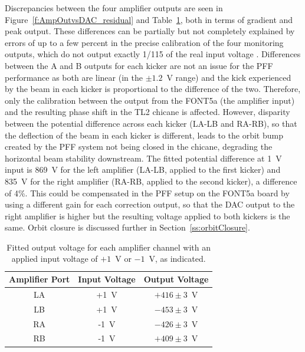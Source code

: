 Discrepancies between the four amplifier outputs are seen in Figure~\ref{f:AmpOutvsDAC_residual} and Table~\ref{t:AmpOutVsDAC}, both in terms of gradient and peak output. These differences can be partially but not completely explained by errors of up to a few percent in the precise calibration of the four monitoring outputs, which do not output exactly 1/115 of the real input voltage \cite{colinPriv}. Differences between the A and B outputs for each kicker are not an issue for the PFF performance as both are linear (in the \(\pm1.2\)~V range) and the kick experienced by the beam in each kicker is proportional to the difference of the two. Therefore, only the calibration between the output from the FONT5a (the amplifier input) and the resulting phase shift in the TL2 chicane is affected. However, disparity between the potential difference across each kicker (LA-LB and RA-RB), so that the deflection of the beam in each kicker is different, leads to the orbit bump created by the PFF system not being closed in the chicane, degrading the horizontal beam stability downstream. The fitted potential difference at 1~V input is 869~V for the left amplifier (LA-LB, applied to the first kicker) and 835~V for the right amplifier (RA-RB, applied to the second kicker), a difference of 4\%. This could be compensated in the PFF setup on the FONT5a board by using a different gain for each correction output, so that the DAC output to the right amplifier is higher but the resulting voltage applied to both kickers is the same. Orbit closure is discussed further in Section~\ref{ss:orbitClosure}.

\begin{table}
  \begin{center}
    \begin{tabular}{| c c c |}
	   \hline
       Amplifier Port & Input Voltage & Output Voltage \\ \hline
       LA & +1~V & \(+416\pm3\)~V \\
	   LB & +1~V & \(-453\pm3\)~V \\
	   RA & -1~V & \(-426\pm3\)~V \\
	   RB & -1~V & \(+409\pm3\)~V \\
 	   \hline
    \end{tabular}
    \caption{Fitted output voltage for each amplifier channel with an applied input voltage of \(+1\)~V or \(-1\)~V, as indicated.}
  	\label{t:AmpOutVsDAC}
  \end{center}
\end{table}

